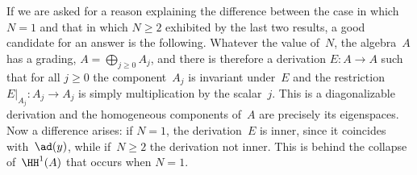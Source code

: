 If we are asked for a reason explaining the difference between the case in
which $N=1$ and that in which $N\geq2$ exhibited by the last two results, a
good candidate for an answer is the following. Whatever the value of~$N$,
the algebra~$A$ has a grading, $A=\bigoplus_{j\geq0}A_j$, and there is
therefore a derivation $E:A\to A$ such that for all $j\geq0$ the
component~$A_j$ is invariant under~$E$ and the restriction~$E|_{A_j}:A_j\to
A_j$ is simply multiplication by the scalar~$j$. This is a diagonalizable
derivation and the homogeneous components of~$A$ are precisely its
eigenspaces. Now a difference arises: if $N=1$, the derivation~$E$ is
inner, since it coincides with~$\ad(y)$, while if~$N\geq2$ the derivation
not inner. This is behind the collapse of~$\HH^1(A)$ that occurs when
$N=1$.

